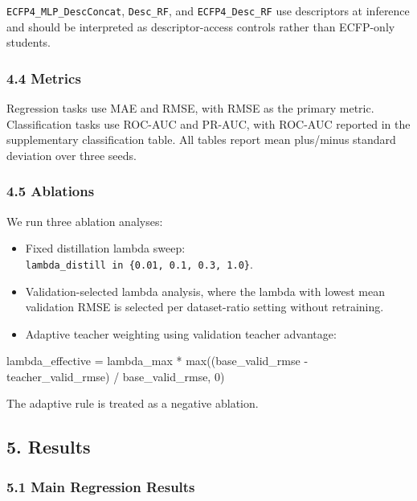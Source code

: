 \documentclass[
]{article}
\newenvironment{Shaded}{}{}
\newcommand{\NormalTok}[1]{#1}
\providecommand{\tightlist}{%
  \setlength{\itemsep}{0pt}\setlength{\parskip}{0pt}}
\begin{document}
\texttt{ECFP4\_MLP\_DescConcat}, \texttt{Desc\_RF}, and
\texttt{ECFP4\_Desc\_RF} use descriptors at inference and should be
interpreted as descriptor-access controls rather than ECFP-only
students.

\subsubsection{4.4 Metrics}\label{metrics}

Regression tasks use MAE and RMSE, with RMSE as the primary metric.
Classification tasks use ROC-AUC and PR-AUC, with ROC-AUC reported in
the supplementary classification table. All tables report mean
plus/minus standard deviation over three seeds.

\subsubsection{4.5 Ablations}\label{ablations}

We run three ablation analyses:

\begin{itemize}
\tightlist
\item
  Fixed distillation lambda sweep:
  \texttt{lambda\_distill\ in\ \{0.01,\ 0.1,\ 0.3,\ 1.0\}}.
\item
  Validation-selected lambda analysis, where the lambda with lowest mean
  validation RMSE is selected per dataset-ratio setting without
  retraining.
\item
  Adaptive teacher weighting using validation teacher advantage:
\end{itemize}

\begin{Shaded}
\begin{Highlighting}[]
\NormalTok{lambda\_effective = lambda\_max * max((base\_valid\_rmse {-} teacher\_valid\_rmse) / base\_valid\_rmse, 0)}
\end{Highlighting}
\end{Shaded}

The adaptive rule is treated as a negative ablation.

\subsection{5. Results}\label{results}

\subsubsection{5.1 Main Regression
Results}\label{main-regression-results}
\end{document}
